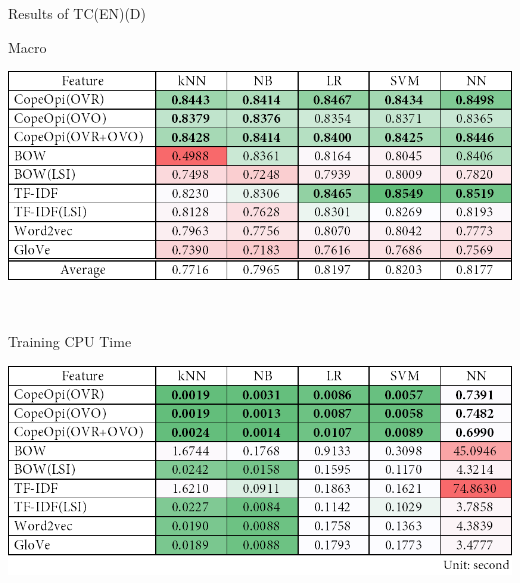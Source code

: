 \begin{table}[H]
\caption{Results of TC(EN)(D)}
\label{tab:tc_en_d}
\centering
\begin{subtable}{\textwidth}
	\centering
	\caption{Macro \fscore{}}
	\includegraphics[width=\resultfigwidth]{chapters/ch4/table/tc/TC(EN)(D).png}
\end{subtable}
\\[\tblskip]
\begin{subtable}{\textwidth}
	\centering
	\caption{Training CPU Time}
	\includegraphics[width=\resultfigwidth]{chapters/ch4/table/tc/TC(EN)(D)T.png}
\end{subtable}
\end{table}